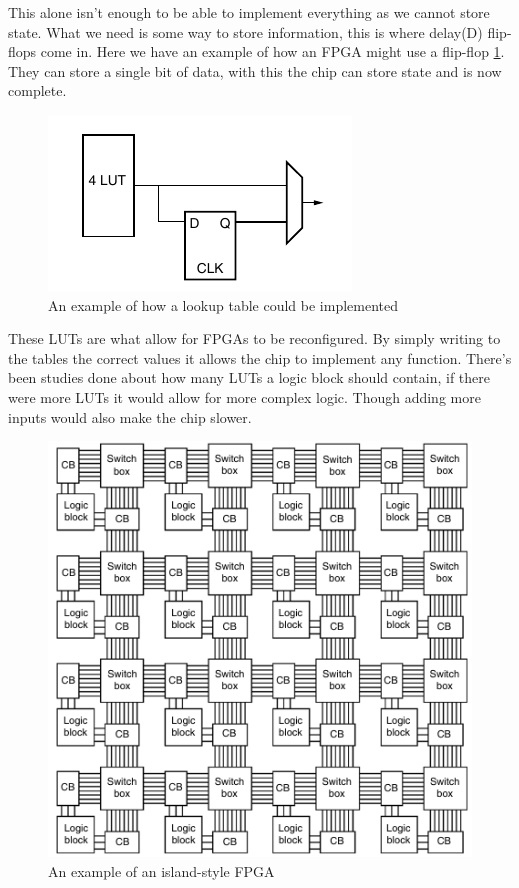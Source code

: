 \documentclass{paper}
\begin{document}
This alone isn't enough to be able to implement everything as we cannot store
state. What we need is some way to store information, this is where delay(D)
flip-flops come in. Here we have an example of how an FPGA might use a
flip-flop \ref{Fig:lut_flipflop}. They can store a single bit of data, with
this the chip can store state and is now complete.

\begin{figure}[H]
    \centering
    \includegraphics[scale=0.6]{lookup_table_flipflop.png}
    \caption{An example of how a lookup table could be implemented\cite{m_d_mano_digital_2012}}
    \label{Fig:lut_flipflop}
\end{figure}

These LUTs are what allow for FPGAs to be reconfigured. By simply writing to
the tables the correct values it allows the chip to implement any function.
There's been studies done about how many LUTs a logic block should contain, if
there were more LUTs it would allow for more complex logic. Though adding more
inputs would also make the chip slower\cite{amano_principles_2018}.

\begin{figure}[H]
    \label{fig:fpga_structure}
    \caption{An example of an island-style FPGA\cite{m_d_mano_digital_2012}}
    \includegraphics[scale=0.7]{fpga_structure.png}
\end{figure}
\end{document}
